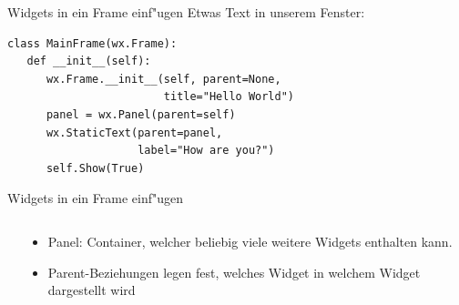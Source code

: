 \begin{frame}[fragile]{Widgets in ein Frame einf"ugen}
Etwas Text in unserem Fenster:
\begin{lstlisting}[style=Python]
class MainFrame(wx.Frame):
   def __init__(self):
      wx.Frame.__init__(self, parent=None, 
                        title="Hello World")
      panel = wx.Panel(parent=self)
      wx.StaticText(parent=panel,
                    label="How are you?")
      self.Show(True)
\end{lstlisting}
\end{frame}

\begin{frame}[fragile]{Widgets in ein Frame einf"ugen}
\begin{columns}
\begin{column}{0.35\textwidth}
\end{column}

\begin{column}{0.65\textwidth}
\begin{itemize}
\item \alert{Panel}: Container, welcher beliebig viele weitere Widgets enthalten kann.
\item Parent-Beziehungen legen fest, welches Widget in welchem Widget dargestellt wird
\end{itemize}
\end{column}
\end{columns}
\end{frame}

